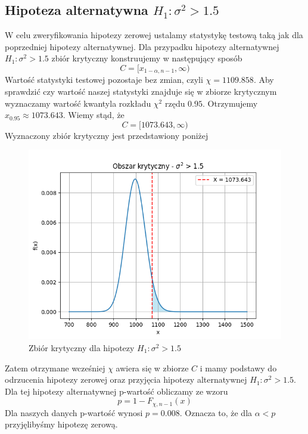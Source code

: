 \documentclass{article}
\begin{document}
\subsection{Hipoteza alternatywna $H_{1}:\sigma^{2}>1.5$}
W celu zweryfikowania hipotezy zerowej ustalamy statystykę testową taką jak dla poprzedniej hipotezy alternatywnej. Dla przypadku hipotezy alternatywnej $H_{1}:\sigma^{2}>1.5$ zbiór krytyczny konstruujemy w następujący sposób
\begin{equation}
C = [x_{1-\alpha,n-1}, \infty)
\end{equation}
Wartość statystyki testowej pozostaje bez zmian, czyli $\chi=1109.858$. Aby sprawdzić czy wartość naszej statystyki znajduje się w zbiorze krytycznym wyznaczamy wartość kwantyla rozkładu $\chi^{2}$ rzędu $0.95$. Otrzymujemy $x_{0.95}\approx1073.643$. Wiemy stąd, że 
\begin{equation}
C = [1073.643,\infty)
\end{equation}
Wyznaczony zbiór krytyczny jest przedstawiony poniżej
\begin{figure}[H]
    \centering
    \includegraphics[scale=0.5]{sig_g.png}
    \caption{Zbiór krytyczny dla hipotezy $H_{1}:\sigma^{2}>1.5$}
    \label{fig:5}
\end{figure}
Zatem otrzymane wcześniej $\chi$ awiera się w zbiorze $C$ i mamy podstawy do odrzucenia hipotezy zerowej oraz przyjęcia hipotezy alternatywnej $H_{1}:\sigma^{2}>1.5$.\\
Dla tej hipotezy alternatywnej p-wartość obliczamy ze wzoru
\begin{equation}
    p = 1-F_{\chi,n-1}(x)
\end{equation}
Dla naszych danych p-wartość wynosi $p=0.008$. Oznacza to, że dla $\alpha<p$ przyjęlibyśmy hipotezę zerową.
\end{document}
